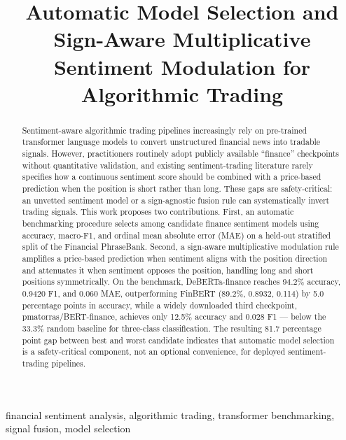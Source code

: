\documentclass[conference]{IEEEtran}
\begin{document}
\title{Automatic Model Selection and Sign-Aware Multiplicative\\
Sentiment Modulation for Algorithmic Trading}

\author{}
\date{}

\maketitle

\begin{abstract}
Sentiment-aware algorithmic trading pipelines increasingly rely on
pre-trained transformer language models to convert unstructured financial
news into tradable signals. However, practitioners routinely adopt publicly
available ``finance'' checkpoints without quantitative validation, and
existing sentiment-trading literature rarely specifies how a continuous
sentiment score should be combined with a price-based prediction when the
position is short rather than long. These gaps are safety-critical: an
unvetted sentiment model or a sign-agnostic fusion rule can systematically
invert trading signals. This work proposes two contributions. First, an
automatic benchmarking procedure selects among candidate finance sentiment
models using accuracy, macro-F1, and ordinal mean absolute error (MAE) on
a held-out stratified split of the Financial PhraseBank. Second, a
sign-aware multiplicative modulation rule amplifies a price-based prediction
when sentiment aligns with the position direction and attenuates it when
sentiment opposes the position, handling long and short positions
symmetrically. On the benchmark, DeBERTa-finance reaches 94.2\% accuracy,
0.9420 F1, and 0.060 MAE, outperforming FinBERT (89.2\%, 0.8932, 0.114)
by 5.0 percentage points in accuracy, while a widely downloaded third
checkpoint, pmatorras/BERT-finance, achieves only 12.5\% accuracy and
0.028 F1 --- below the 33.3\% random baseline for three-class
classification. The resulting 81.7 percentage point gap between best and
worst candidate indicates that automatic model selection is a safety-critical
component, not an optional convenience, for deployed sentiment-trading
pipelines.
\end{abstract}

\begin{IEEEkeywords}
financial sentiment analysis, algorithmic trading, transformer benchmarking,
signal fusion, model selection
\end{IEEEkeywords}
\end{document}
